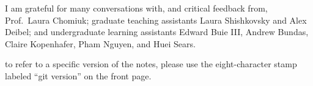 I am grateful for many conversations with, and critical feedback from, Prof.~Laura Chomiuk; graduate teaching assistants Laura Shishkovsky and Alex Deibel; and undergraduate learning assistants Edward Buie III, Andrew Bundas, Claire Kopenhafer, Pham Nguyen, and Huei Sears. 

 to refer to a specific version of the notes, please use the eight-character stamp labeled ``git version'' on the front page.

